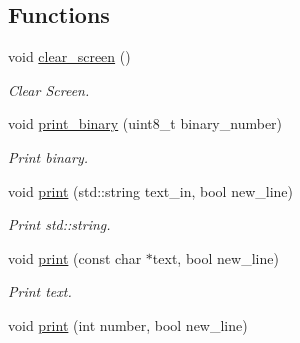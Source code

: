 \subsection*{Functions}
\begin{DoxyCompactItemize}
\item 
void \hyperlink{namespaceSPMB_1_1util_a49c998abcde5121db1901865ebe25d6c}{clear\+\_\+screen} ()\hypertarget{namespaceSPMB_1_1util_a49c998abcde5121db1901865ebe25d6c}{}\label{namespaceSPMB_1_1util_a49c998abcde5121db1901865ebe25d6c}

\begin{DoxyCompactList}\small\item\em Clear Screen. \end{DoxyCompactList}\item 
void \hyperlink{namespaceSPMB_1_1util_ab22b4ff0cee38fd3f446baa578e62a13}{print\+\_\+binary} (uint8\+\_\+t binary\+\_\+number)\hypertarget{namespaceSPMB_1_1util_ab22b4ff0cee38fd3f446baa578e62a13}{}\label{namespaceSPMB_1_1util_ab22b4ff0cee38fd3f446baa578e62a13}

\begin{DoxyCompactList}\small\item\em Print binary. \end{DoxyCompactList}\item 
void \hyperlink{namespaceSPMB_1_1util_adc278024a8899778608a23fe569239aa}{print} (std\+::string text\+\_\+in, bool new\+\_\+line)\hypertarget{namespaceSPMB_1_1util_adc278024a8899778608a23fe569239aa}{}\label{namespaceSPMB_1_1util_adc278024a8899778608a23fe569239aa}

\begin{DoxyCompactList}\small\item\em Print std\+::string. \end{DoxyCompactList}\item 
void \hyperlink{namespaceSPMB_1_1util_aef9b8fb539af91ef114d7e5069bf1ffd}{print} (const char $\ast$text, bool new\+\_\+line)\hypertarget{namespaceSPMB_1_1util_aef9b8fb539af91ef114d7e5069bf1ffd}{}\label{namespaceSPMB_1_1util_aef9b8fb539af91ef114d7e5069bf1ffd}

\begin{DoxyCompactList}\small\item\em Print text. \end{DoxyCompactList}\item 
void \hyperlink{namespaceSPMB_1_1util_a4c5086c3e792e782fed53beeee6ab583}{print} (int number, bool new\+\_\+line)\hypertarget{namespaceSPMB_1_1util_a4c5086c3e792e782fed53beeee6ab583}{}\label{namespaceSPMB_1_1util_a4c5086c3e792e782fed53beeee6ab583}


\end{DoxyCompactItemize}
